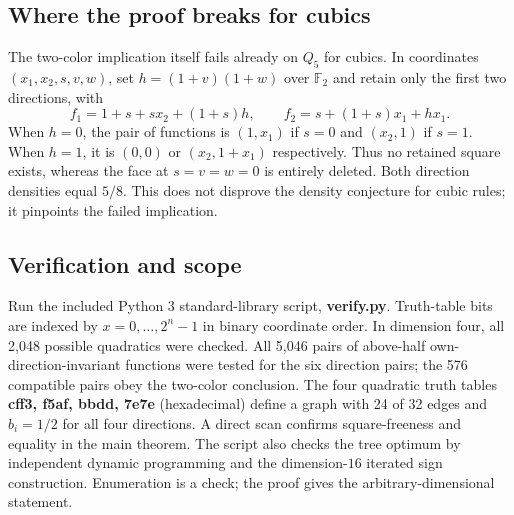 \documentclass[
  10pt,
]{article}
\begin{document}
\subsection{Where the proof breaks for
cubics}\label{where-the-proof-breaks-for-cubics}

The two-color implication itself fails already on \(Q_5\) for cubics. In
coordinates \((x_1,x_2,s,v,w)\), set \(h=(1+v)(1+w)\) over
\(\mathbb F_2\) and retain only the first two directions, with \[
f_1=1+s+s x_2+(1+s)h,\qquad f_2=s+(1+s)x_1+h x_1.
\] When \(h=0\), the pair of functions is \((1,x_1)\) if \(s=0\) and
\((x_2,1)\) if \(s=1\). When \(h=1\), it is \((0,0)\) or \((x_2,1+x_1)\)
respectively. Thus no retained square exists, whereas the face at
\(s=v=w=0\) is entirely deleted. Both direction densities equal \(5/8\).
This does not disprove the density conjecture for cubic rules; it
pinpoints the failed implication.

\subsection{Verification and scope}\label{verification-and-scope}

Run the included Python 3 standard-library script, \textbf{verify.py}.
Truth-table bits are indexed by \(x=0,\dots,2^n-1\) in binary coordinate
order. In dimension four, all 2,048 possible quadratics were checked.
All 5,046 pairs of above-half own-direction-invariant functions were
tested for the six direction pairs; the 576 compatible pairs obey the
two-color conclusion. The four quadratic truth tables \textbf{cff3,
f5af, bbdd, 7e7e} (hexadecimal) define a graph with 24 of 32 edges and
\(b_i=1/2\) for all four directions. A direct scan confirms
square-freeness and equality in the main theorem. The script also checks
the tree optimum by independent dynamic programming and the
dimension-\(16\) iterated sign construction. Enumeration is a check; the
proof gives the arbitrary-dimensional statement.
\end{document}
